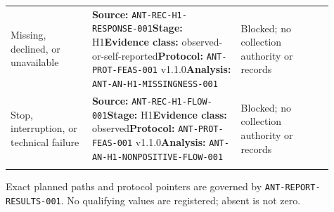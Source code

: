 \begin{tabular}{@{}>{\raggedright\arraybackslash}p{0.23\linewidth}>{\raggedright\arraybackslash}p{0.42\linewidth}>{\raggedright\arraybackslash}p{0.26\linewidth}@{}}
\addlinespace[0.25em]
Missing, declined, or unavailable & {\scriptsize\textbf{Source:} \nolinkurl{ANT-REC-H1-RESPONSE-001}\newline \textbf{Stage:} H1\newline\textbf{Evidence class:} observed-or-self-reported\newline\textbf{Protocol:} \nolinkurl{ANT-PROT-FEAS-001} v1.1.0\newline\textbf{Analysis:} \nolinkurl{ANT-AN-H1-MISSINGNESS-001}} & Blocked; no collection authority or records \\
\addlinespace[0.25em]
Stop, interruption, or technical failure & {\scriptsize\textbf{Source:} \nolinkurl{ANT-REC-H1-FLOW-001}\newline \textbf{Stage:} H1\newline\textbf{Evidence class:} observed\newline\textbf{Protocol:} \nolinkurl{ANT-PROT-FEAS-001} v1.1.0\newline\textbf{Analysis:} \nolinkurl{ANT-AN-H1-NONPOSITIVE-FLOW-001}} & Blocked; no collection authority or records \\
\addlinespace[0.25em]
\bottomrule
\end{tabular}%
\par\smallskip
{\raggedright\scriptsize Exact planned paths and protocol pointers are governed by \texttt{ANT-REPORT-RESULTS-001}. No qualifying values are registered; absent is not zero.\par}
